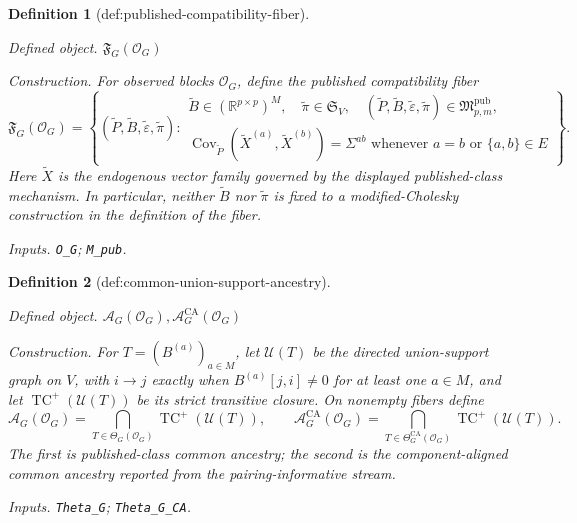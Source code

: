 \documentclass{article}
\newtheorem{definition}{Definition}
\begin{document}
\begin{definition}[def:published-compatibility-fiber]\label{def:published-compatibility-fiber}
\par\smallskip\noindent\emph{Defined object.} \(\mathfrak F_G(\mathcal O_G)\)
\par\smallskip\noindent\emph{Construction.} For observed blocks \(\mathcal O_G\), define the published compatibility fiber
\[
 \mathfrak F_G(\mathcal O_G)=\left\{(\widetilde P,\widetilde B,
 \widetilde\varepsilon,\widetilde\pi):\begin{array}{l}
 \widetilde B\in(\mathbb R^{p\times p})^M,\quad
 \widetilde\pi\in\mathfrak S_V,\quad
 (\widetilde P,\widetilde B,\widetilde\varepsilon,
 \widetilde\pi)\in\mathfrak M_{p,m}^{\mathrm{pub}},\\
 \operatorname{Cov}_{\widetilde P}(\widetilde X^{(a)},
 \widetilde X^{(b)})=\Sigma^{ab}
 \text{ whenever }a=b\text{ or }\{a,b\}\in E
 \end{array}\right\}.
\]
Here \(\widetilde X\) is the endogenous vector family governed by the displayed published-class mechanism. In particular, neither \(\widetilde B\) nor \(\widetilde\pi\) is fixed to a modified-Cholesky construction in the definition of the fiber.
\par\smallskip\noindent\emph{Inputs.} \texttt{O\_\allowbreak{}G}; \texttt{M\_\allowbreak{}pub}.
\end{definition}

\begin{definition}[def:common-union-support-ancestry]\label{def:common-union-support-ancestry}
\par\smallskip\noindent\emph{Defined object.} \(\mathcal A_G(\mathcal O_G),\mathcal A_G^{\mathrm{CA}}(\mathcal O_G)\)
\par\smallskip\noindent\emph{Construction.} For \(T=(B^{(a)})_{a\in M}\), let \(\mathcal U(T)\) be the directed union-support graph on \(V\), with \(i\to j\) exactly when \(B^{(a)}[j,i]\ne0\) for at least one \(a\in M\), and let \(\operatorname{TC}^{+}(\mathcal U(T))\) be its strict transitive closure.  On nonempty fibers define
\[
 \mathcal A_G(\mathcal O_G)=
 \bigcap_{T\in\Theta_G(\mathcal O_G)}
 \operatorname{TC}^{+}(\mathcal U(T)),
 \qquad
 \mathcal A_G^{\mathrm{CA}}(\mathcal O_G)=
 \bigcap_{T\in\Theta_G^{\mathrm{CA}}(\mathcal O_G)}
 \operatorname{TC}^{+}(\mathcal U(T)).
\]
The first is published-class common ancestry; the second is the component-aligned common ancestry reported from the pairing-informative stream.
\par\smallskip\noindent\emph{Inputs.} \texttt{Theta\_\allowbreak{}G}; \texttt{Theta\_\allowbreak{}G\_\allowbreak{}CA}.
\end{definition}
\end{document}
